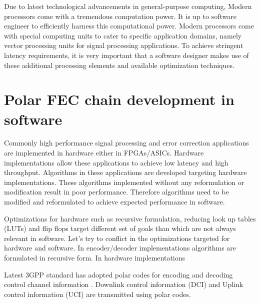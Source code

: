 Due to latest technological advancements in general-purpose computing, Modern processors come with a tremendous computation power. It is up to software engineer to efficiently harness this computational power. Modern processors come with special computing units to cater to specific application domains, namely vector processing units for signal processing applications. To achieve stringent latency requirements, it is very important that a software designer makes use of these additional processing elements and available optimization techniques.

%
%

\section{Polar FEC chain development in software}
Commonly high performance signal processing and error correction applications are implemented in hardware either in FPGAs/ASICs. Hardware implementations allow these applications to achieve low latency and high throughput. Algorithms in these applications are developed targeting hardware implementations. These algorithms implemented without any reformulation or modification result in poor performance. Therefore algorithms need to be modified and reformulated to achieve expected performance in software.

Optimizations for hardware such as recursive formulation, reducing look up tables (LUTs) and flip flops target different set of goals than which are not always relevant in software. Let's try to conflict in the optimizations targeted for hardware and software. In encoder/decoder implementations algorithms are formulated in recursive form. In hardware implementations 



Latest 3GPP standard has adopted polar codes for encoding and decoding control channel information \cite{3gpp.38.212}. Downlink control information (DCI) and Uplink control information (UCI) are transmitted using polar codes.



